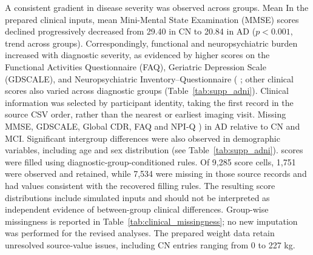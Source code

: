 \documentclass{article}
\providecommand{\DIFaddtex}[1]{{\protect\color{blue} \sf #1}} %
\providecommand{\DIFdeltex}[1]{{\protect\color{red} \scriptsize #1}} %
\providecommand{\DIFaddbegin}{} %
\providecommand{\DIFaddend}{} %
\providecommand{\DIFdelbegin}{} %
\providecommand{\DIFdelend}{} %
\providecommand{\DIFadd}[1]{\texorpdfstring{\DIFaddtex{#1}}{#1}} %
\providecommand{\DIFdel}[1]{\texorpdfstring{\DIFdeltex{#1}}{}} %
\newcommand{\DIFscaledelfig}{0.5}
\newlength{\DIFdelgraphicswidth} %
\newlength{\DIFdelgraphicsheight} %
\newcommand{\DIFaddincludegraphics}[2][]{{\color{blue}\fbox{\DIFOincludegraphics[#1]{#2}}}} %
\newcommand{\DIFdelincludegraphics}[2][]{%
\sbox{\DIFdelgraphicsbox}{\DIFOincludegraphics[#1]{#2}}%
\settoboxwidth{\DIFdelgraphicswidth}{\DIFdelgraphicsbox} %
\settoboxtotalheight{\DIFdelgraphicsheight}{\DIFdelgraphicsbox} %
\scalebox{\DIFscaledelfig}{%
\parbox[b]{\DIFdelgraphicswidth}{\usebox{\DIFdelgraphicsbox}\\[-\baselineskip] \rule{\DIFdelgraphicswidth}{0em}}\llap{\resizebox{\DIFdelgraphicswidth}{\DIFdelgraphicsheight}{%
\setlength{\unitlength}{\DIFdelgraphicswidth}%
\begin{picture}(1,1)%
\thicklines\linethickness{2pt} %
{\color[rgb]{1,0,0}\put(0,0){\framebox(1,1){}}}%
{\color[rgb]{1,0,0}\put(0,0){\line( 1,1){1}}}%
{\color[rgb]{1,0,0}\put(0,1){\line(1,-1){1}}}%
\end{picture}%
}\hspace*{3pt}}} %
} %
\DeclareRobustCommand{\DIFaddbegin}{\DIFOaddbegin \let\includegraphics\DIFaddincludegraphics} %
\DeclareRobustCommand{\DIFaddend}{\DIFOaddend \let\includegraphics\DIFOincludegraphics} %
\DeclareRobustCommand{\DIFdelbegin}{\DIFOdelbegin \let\includegraphics\DIFdelincludegraphics} %
\DeclareRobustCommand{\DIFdelend}{\DIFOaddend \let\includegraphics\DIFOincludegraphics} %
\begin{document}
\DIFdelbegin \DIFdel{A consistent gradient in disease severity was observed across groups. Mean }\DIFdelend \DIFaddbegin \DIFadd{In the prepared clinical inputs, mean }\DIFaddend Mini-Mental State Examination (MMSE) scores \DIFdelbegin \DIFdel{declined progressively }\DIFdelend \DIFaddbegin \DIFadd{decreased }\DIFaddend from 29.40 in CN to 20.84 in AD\DIFdelbegin \DIFdel{($p < 0.001$, trend across groups). Correspondingly, functional and neuropsychiatric burden increased with diagnostic severity, as evidenced by higher scores on the Functional Activities Questionnaire (FAQ), Geriatric Depression Scale (GDSCALE), and Neuropsychiatric Inventory–Questionnaire (}\DIFdelend \DIFaddbegin \DIFadd{; other clinical scores also varied across diagnostic groups (Table~\ref{tab:supp_adni}). Clinical information was selected by participant identity, taking the first record in the source CSV order, rather than the nearest or earliest imaging visit. Missing MMSE, GDSCALE, Global CDR, FAQ and }\DIFaddend NPI-Q \DIFdelbegin \DIFdel{) in AD relative to CN and MCI. Significant intergroup differences were also observed in demographic variables, including age and sex distribution (see Table~\ref{tab:supp_adni}).
}\DIFdelend \DIFaddbegin \DIFadd{scores were filled using diagnostic-group-conditioned rules. Of 9,285 score cells, 1,751 were observed and retained, while 7,534 were missing in those source records and had values consistent with the recovered filling rules. The resulting score distributions include simulated inputs and should not be interpreted as independent evidence of between-group clinical differences. Group-wise missingness is reported in Table~\ref{tab:clinical_missingness}; no new imputation was performed for the revised analyses. The prepared weight data retain unresolved source-value issues, including CN entries ranging from 0 to 227 kg.
}\DIFaddend 
\end{document}
